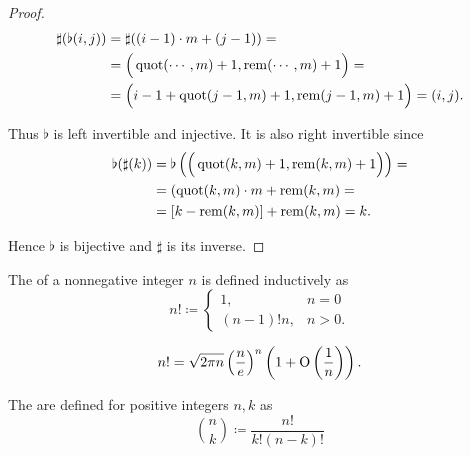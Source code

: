 \begin{proof}
  \begin{align*}
    \sharp(\flat(i, j))
    &=
    \sharp((i - 1) \cdot m + (j - 1))
    = \\ &=
    \Big( \operatorname{quot}( \cdots, m) + 1, \operatorname{rem}( \cdots, m) + 1 \Big)
    = \\ &=
    \Big( i - 1 + \operatorname{quot}(j - 1, m) + 1, \operatorname{rem}(j - 1, m) + 1 \Big)
    =
    (i, j).
  \end{align*}

  Thus \( \flat \) is left invertible and injective. It is also right invertible since
  \begin{align*}
    \flat(\sharp(k))
    &=
    \flat\left( \Big( \operatorname{quot}(k, m) + 1, \operatorname{rem}(k, m) + 1 \Big) \right)
    = \\ &=
    (\operatorname{quot}(k, m) \cdot m + \operatorname{rem}(k, m)
    = \\ &=
    [k - \operatorname{rem}(k, m)] + \operatorname{rem}(k, m)
    =
    k.
  \end{align*}

  Hence \( \flat \) is bijective and \( \sharp \) is its inverse.
\end{proof}

\begin{definition}\label{def:factorial}
  The  of a nonnegative integer \( n \) is defined inductively as
  \begin{equation*}
    n! \coloneqq \begin{cases}
      1,          &n = 0 \\
      (n - 1)! n, &n > 0.
    \end{cases}
  \end{equation*}
\end{definition}

\begin{theorem}\label{thm:stirlings_approximation}
  \begin{equation*}
    n! = \sqrt{2 \pi n} \left(\frac n e \right)^n \left(1 + \operatorname{O} \left(\frac 1 n \right) \right).
  \end{equation*}
\end{theorem}

\begin{definition}\label{def:binomial_coefficient}
  The  are defined for positive integers \( n, k \) as
  \begin{equation*}
    \binom n k \coloneqq \frac {n!} {k!(n-k)!}
  \end{equation*}
\end{definition}

